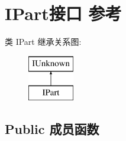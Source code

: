 \hypertarget{interface_i_part}{}\section{I\+Part接口 参考}
\label{interface_i_part}
类 I\+Part 继承关系图\+:\begin{figure}[H]
\begin{center}
\leavevmode
\includegraphics[height=2.000000cm]{interface_i_part}
\end{center}
\end{figure}
\subsection*{Public 成员函数}
